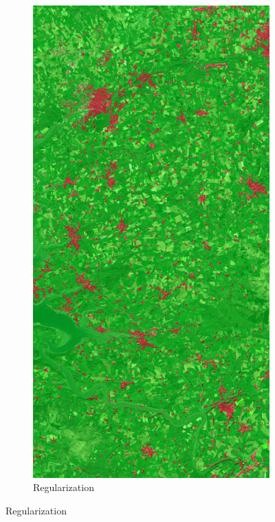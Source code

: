 \documentclass[10pt]{article}
\begin{document}
\begin{appendices}
\begin{figure}[H]
\begin{subfigure}{0.49\textwidth}
    \end{subfigure}
    \begin{subfigure}{0.49\textwidth}
        \centering
        \includegraphics[width=\textwidth]{all_regul_Min_l1000_g30_e500_0_0_0_overlay}
        \caption{Regularization} %

\end{subfigure}
\end{figure}
\end{appendices}
\end{document}
